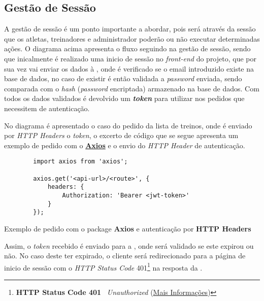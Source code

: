 \subsection{Gestão de Sessão}
\label{sessionSequenceDiagram}


A gestão de sessão é um ponto importante a abordar, pois será através da sessão que os atletas, treinadores e administrador poderão ou não executar determinadas ações. O diagrama acima apresenta o fluxo seguindo  na gestão de sessão, sendo que inicalmente é realizado uma inicio de sessão no \textit{front-end} do projeto, que por sua vez vai enviar os dados à \textbf{}, onde é verificado se o email introduzido existe na base de dados, no caso de existir é então validada a \textit{password} enviada, sendo comparada com o \textit{hash} (\textit{password} encriptada) armazenado na base de dados. Com todos os dados validados é devolvido um \textbf{ \textit{token}} para utilizar nos pedidos que necessitem de autenticação.

No diagrama é apresentado o caso do pedido da lista de treinos, onde é enviado por \textit{HTTP Headers} o \textit{token}, o excerto de código que se segue apresenta um exemplo de pedido com o \textit{} \textbf{\href{https://github.com/axios/axios}{Axios}} e o envio do \textit{HTTP Header} de autenticação.

\begin{longlisting}
	\begin{verbatim}
		import axios from 'axios';

		axios.get('<api-url>/<route>', {
			headers: {
				Authorization: 'Bearer <jwt-token>'
			}
		});
	\end{verbatim}

	\caption{Exemplo de pedido com o package \textbf{Axios} e autenticação por \textbf{HTTP Headers}}
\end{longlisting}

Assim, o \textit{token} \textbf{} recebido é enviado para a \textbf{}, onde será validado se este expirou ou não. No caso deste ter expirado, o cliente será redirecionado para a página de inicio de sessão com o \textit{HTTP Status Code} 401\footnote{\textbf{HTTP Status Code 401 \textemdash} ~\textit{Unauthorized} (\href{https://developer.mozilla.org/pt-BR/docs/Web/HTTP/Status/401}{Mais Informações})} na resposta da \textbf{}.